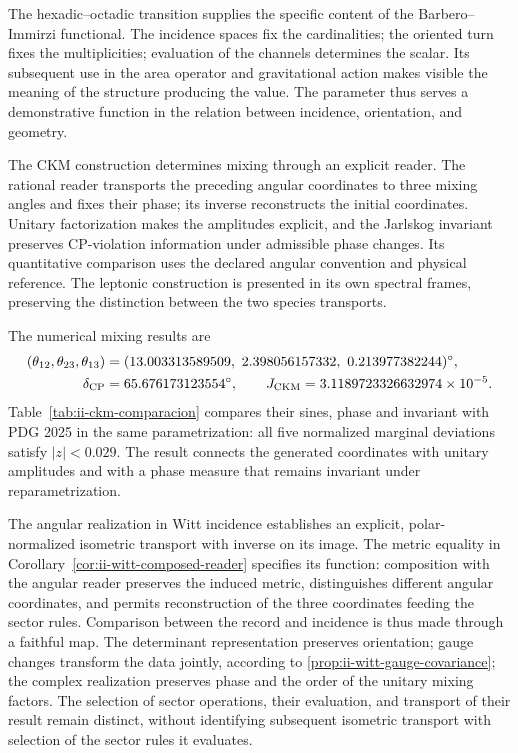The hexadic--octadic transition supplies the specific content of the
Barbero--Immirzi functional. The incidence spaces fix the
cardinalities; the oriented turn fixes the multiplicities; evaluation
of the channels determines the scalar. Its subsequent use in the
area operator and gravitational action makes visible the meaning
of the structure producing the value. The parameter thus serves a
demonstrative function in the relation between incidence, orientation, and
geometry.

The CKM construction determines mixing through an explicit reader. The
rational reader transports the preceding angular coordinates to three
mixing angles and fixes their phase; its inverse reconstructs the initial
coordinates. Unitary factorization makes the amplitudes explicit, and the
Jarlskog invariant preserves CP-violation information under
admissible phase changes. Its quantitative comparison uses
the declared angular convention and physical reference. The leptonic
construction is presented in its own spectral frames, preserving the
distinction between the two species transports.

The numerical mixing results are
\begin{align*}
 (\theta_{12},\theta_{23},\theta_{13})
   &=(13.003313589509,\ 2.398056157332,\ 0.213977382244)^\circ,\\
 \delta_{\rm CP}&=65.676173123554^\circ,\qquad
 J_{\rm CKM}=3.1189723326632974\times10^{-5}.
\end{align*}
Table~\ref{tab:ii-ckm-comparacion} compares their sines, phase and
invariant with PDG 2025 in the same parametrization: all five normalized
marginal deviations satisfy $|z|<0.029$. The result connects the
generated coordinates with unitary amplitudes and with a phase measure
that remains invariant under reparametrization.

The angular realization in Witt incidence establishes an explicit,
polar-normalized isometric transport with inverse on its image.
The metric equality in Corollary~\ref{cor:ii-witt-composed-reader}
specifies its function: composition with the angular reader preserves the
induced metric, distinguishes different angular coordinates, and permits
reconstruction of the three coordinates feeding the sector rules.
Comparison between the record and incidence is thus made through
a faithful map. The determinant representation preserves
orientation; gauge changes transform the data jointly,
according to \ref{prop:ii-witt-gauge-covariance}; the complex realization preserves
phase and the order of the unitary mixing factors. The selection
of sector operations, their evaluation, and transport of their
result remain distinct, without identifying subsequent isometric transport with selection of
the sector rules it evaluates.

